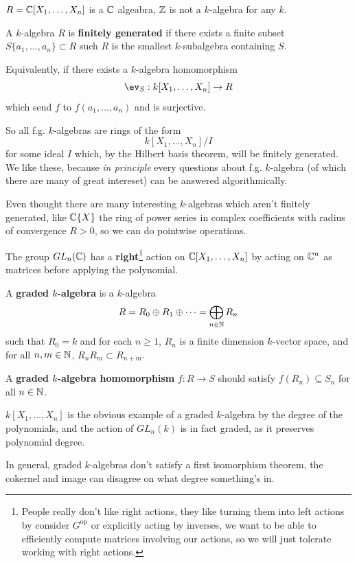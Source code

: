 \documentclass{article}
\begin{document}
$R=\mathbb{C}[X_1,\ldots,X_n]$ is a $\mathbb{C}$ algeabra, $\mathbb{Z}$ is not a $k$-algebra for any $k$.

\begin{definition}
    A $k$-algebra $R$ is \textbf{finitely generated} if there exists a finite subset $S\{a_1,\ldots,a_n\}\subset R$ such $R$ is the smallest $k$-subalgebra containing $S$.

    Equivalently, if there exists a $k$-algebra homomorphism \[
    \ev_S:k[X_1,\ldots,X_n]\rightarrow R
    \] which send $f$ to $f(a_1,\ldots,a_n)$ and is surjective.
\end{definition}

So all f.g. $k$-algebras are rings of the form \[
k[X_1,\ldots,X_n]/I
\] for some ideal $I$ which, by the Hilbert basis theorem, will be finitely generated. We like these, because \textit{in principle} every questions about f.g. $k$-algebra (of which there are many of great intereset) can be answered algorithmically.

Even thought there are many interesting $k$-algebras which aren't finitely generated, like $\mathbb{C}\{X\}$ the ring of power series in complex coefficients with radius of convergence $R>0$, so we can do pointwise operations.

The group $GL_n(\mathbb{C})$ has a \textbf{right}\footnote{People really don't like right actions, they like turning them into left actions by consider $G^\text{op}$ or explicitly acting  by inverses, we want to be able to efficiently compute matrices involving our actions, so we will just tolerate working with right actions.} action on $\mathbb{C}[X_1,\ldots,X_n]$ by acting on $\mathbb{C}^n$ as matrices before applying the polynomial.

\begin{definition}
    A \textbf{graded $k$-algebra} is a $k$-algebra \[
    R = R_0 \oplus R_1 \oplus \cdots = \bigoplus_{n\in\mathbb{N}}R_n
    \] such that $R_0=k$ and for each $n\geq 1$, $R_n$ is a finite dimension $k$-vector space, and for all $n,m\in\mathbb{N}$, $R_nR_m\subset R_{n+m}$.

    A \textbf{graded $k$-algebra homomorphism} $f:R\rightarrow S$ should satisfy $f(R_n)\subseteq S_n$ for all $n\in \mathbb{N}$.
\end{definition}

$k[X_1,\ldots,X_n]$ is the obvious example of a graded $k$-algebra by the degree of the polynomials, and the action of $GL_n(k)$ is in fact graded, as it preserves polynomial degree.

In general, graded $k$-algebras don't satisfy a first isomorphism theorem, the cokernel and image can disagree on what degree something's in.
\end{document}
